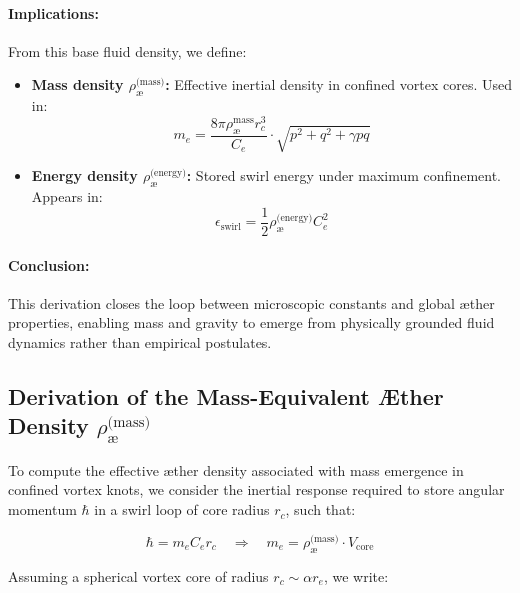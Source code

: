\documentclass[12pt]{article}
\begin{document}
                \paragraph{Implications:}
                From this base fluid density, we define:
                \begin{itemize}
                    \item \textbf{Mass density \boldmath\( \rho_{\text{\ae}}^{\text{(mass)}} \):} Effective inertial density in confined vortex cores. Used in:
                    \[
                    m_e = \frac{8\pi \rho_{\text{\ae}}^{\text{mass}} r_c^3}{C_e} \cdot \sqrt{p^2 + q^2 + \gamma pq}
                    \]
                    \item \textbf{Energy density \boldmath\( \rho_{\text{\ae}}^{\text{(energy)}} \):} Stored swirl energy under maximum confinement. Appears in:
                    \[
                    \epsilon_{\text{swirl}} = \frac{1}{2} \rho_{\text{\ae}}^{\text{(energy)}} C_e^2
                    \]
                \end{itemize}
        
                \paragraph{Conclusion:}
                This derivation closes the loop between microscopic constants and global æther properties, enabling mass and gravity to emerge from physically grounded fluid dynamics rather than empirical postulates.
        
                \subsection{Derivation of the Mass-Equivalent Æther Density \boldmath\( \rho_{\text{\ae}}^{\text{(mass)}} \)}
        
                To compute the effective æther density associated with mass emergence in confined vortex knots, we consider the inertial response required to store angular momentum \( \hbar \) in a swirl loop of core radius \( r_c \), such that:
        
                \[
                \hbar = m_e C_e r_c
                \quad \Rightarrow \quad
                m_e = \rho_{\text{\ae}}^{\text{(mass)}} \cdot V_{\text{core}}
                \]
        
                Assuming a spherical vortex core of radius \( r_c \sim \alpha r_e \), we write:
        
\end{document}
